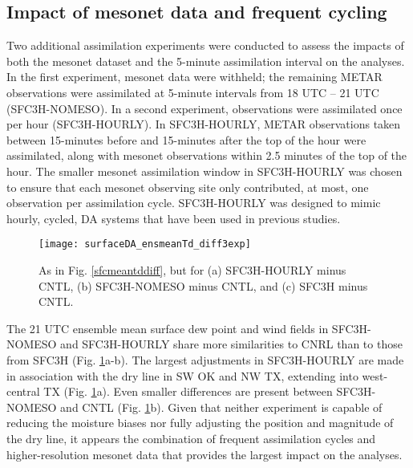 \subsection{Impact of mesonet data and frequent cycling}
Two additional assimilation experiments were conducted to assess the impacts of both the mesonet dataset and the 5-minute assimilation interval on the analyses. In the first experiment, mesonet data were withheld; the remaining METAR observations were assimilated at 5-minute intervals from 18 UTC – 21 UTC (SFC3H-NOMESO). In a second experiment, observations were assimilated once per hour (SFC3H-HOURLY). In SFC3H-HOURLY, METAR observations taken between 15-minutes before and 15-minutes after the top of the hour were assimilated, along with mesonet observations within 2.5 minutes of the top of the hour. The smaller mesonet assimilation window in SFC3H-HOURLY was chosen to ensure that each mesonet observing site only contributed, at most, one observation per assimilation cycle. SFC3H-HOURLY was designed to mimic hourly, cycled, DA systems that have been used in previous studies.
\begin{figure}
\centering
\texttt{[image: surfaceDA\_ensmeanTd\_diff3exp]}
\caption{As in Fig. \ref{sfcmeantddiff}, but for (a) SFC3H-HOURLY minus CNTL, (b) SFC3H-NOMESO minus CNTL, and (c) SFC3H minus CNTL.}
\label{sfcmeantddiff3exp}
\end{figure}
The 21 UTC ensemble mean surface dew point and wind fields in SFC3H-NOMESO and SFC3H-HOURLY share more similarities to CNRL than to those from SFC3H (Fig. \ref{sfcmeantddiff3exp}a-b). The largest adjustments in SFC3H-HOURLY are made in association with the dry line in SW OK and NW TX, extending into west-central TX (Fig. \ref{sfcmeantddiff3exp}a). Even smaller differences are present between SFC3H-NOMESO and CNTL (Fig. \ref{sfcmeantddiff3exp}b). Given that neither experiment is capable of reducing the moisture biases nor fully adjusting the position and magnitude of the dry line, it appears the combination of frequent assimilation cycles and higher-resolution mesonet data that provides the largest impact on the analyses.

